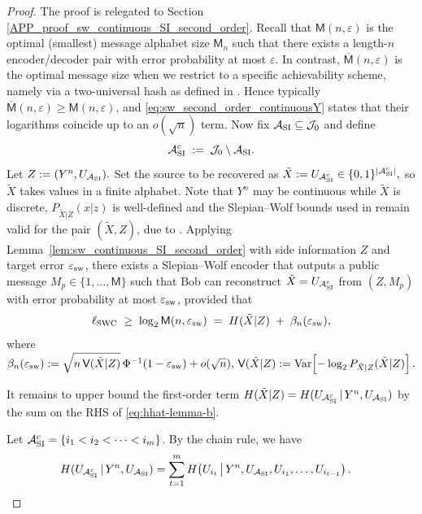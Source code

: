 \documentclass[onecolumn]{IEEEtran} %
\newcommand{\Var}{\operatorname{Var}}
\newcommand{\1}{\mathbbm{1}}
\theoremstyle{boldremark}
\begin{document}
\begin{proof}
The proof is relegated to Section \ref{APP_proof_sw_continuous_SI_second_order}. Recall that $\textsf{M}(n,\varepsilon)$ is the optimal (smallest) message alphabet size $\textsf{M}_n$ such that there exists a length-$n$ encoder/decoder pair with error probability at most $\varepsilon$. 
In contrast, $\overline{\textsf{M}}(n,\varepsilon)$ is the optimal message size when we restrict to a specific achievability scheme, namely via a two-universal hash as defined in \cite[Sec.~3.1]{Hayashi_SWC_Entropy20}. 
Hence typically $\overline{\textsf{M}}(n,\varepsilon)\ge \textsf{M}(n,\varepsilon)$, and \eqref{eq:sw_second_order_continuousY} states that their logarithms coincide up to an $o(\sqrt{n})$ term. Now fix $\mathcal{A}_{\rm SI}\subseteq\mathcal J_0$ and define
\[
\mathcal{A}_{\rm SI}^c \;:=\; \mathcal J_0\setminus \mathcal{A}_{\rm SI}.
\]
Let
$  Z := (Y^n,U_{\mathcal{A}_{\rm SI}}).$ Set the source to be recovered as
$  \tilde{X} := U_{\mathcal{A}_{\rm SI}^c}\in\{0,1\}^{|\mathcal{A}_{\rm SI}^c|},$ so $\tilde{X}$ takes values in a finite alphabet. Note that $Y^n$ may be continuous while $\tilde{X}$ is discrete, $P_{\tilde{X}|Z}(x|z)$ is well-defined and the Slepian--Wolf bounds used in \cite[Sec.~3.1--Sec.~3.2]{Hayashi_SWC_Entropy20}
remain valid for the pair $(\tilde{X},Z)$, due to \cite[Remark~1]{Hayashi_SWC_Entropy20}.
Applying Lemma~\ref{lem:sw_continuous_SI_second_order} with side information $Z$ and target error
$\varepsilon_{\rm sw}$, there exists a Slepian--Wolf encoder that outputs a public message
$M_p\in\{1,\dots,\textsf{M}\}$ such that Bob can reconstruct $\tilde{X}=U_{\mathcal{A}_{\rm SI}^c}$ from $(Z,M_p)$ with
error probability at most $\varepsilon_{\rm sw}$, provided that
\begin{equation}\label{eq:ell_ge_Hplusbeta}
  \ell_{\rm SWC} \;\ge\; \log_2 \textsf{M}(n,\varepsilon_{\rm sw})
  \;=\; H(\tilde{X}|Z) \;+\; \beta_n(\varepsilon_{\rm sw}),
\end{equation}
where $  \beta_n(\varepsilon_{\rm sw})  :=  \sqrt{n\,\textsf{V}(\tilde{X}|Z)}\,\Phi^{-1}(1-\varepsilon_{\rm sw}) + o(\sqrt{n}),\,\textsf{V}(\tilde{X}|Z)
  :=
  \Var\!\left[-\log_2 P_{\tilde{X}|Z}(\tilde{X}|Z)\right].$


It remains to upper bound the first-order term $H(\tilde{X}|Z)=H(U_{\mathcal{A}_{\rm SI}^c}\,|\,Y^n,U_{\mathcal{A}_{\rm SI}})$
by the sum on the RHS of \eqref{eq:hhat-lemma-b}.

Let $\mathcal{A}_{\rm SI}^c=\{i_1<i_2<\cdots<i_m\}$.
By the chain rule, we have
\begin{align}
  H(U_{\mathcal{A}_{\rm SI}^c}\,|\,Y^n,U_{\mathcal{A}_{\rm SI}})
  &=
  \sum_{t=1}^m
  H\!\left(
    U_{i_t}\,\middle|\,
    Y^n, U_{\mathcal{A}_{\rm SI}}, U_{i_1},\ldots,U_{i_{t-1}}
  \right).
  \label{eq:chain_rule_subset}
\end{align}


\end{proof}
\end{document}
